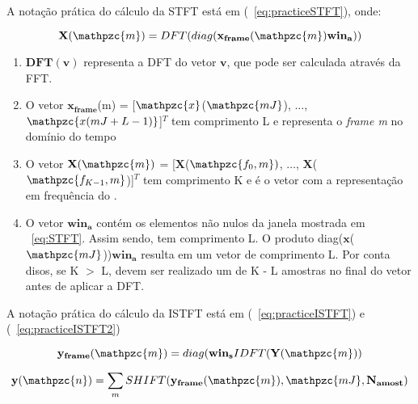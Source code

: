         A notação prática do cálculo da STFT está em (~\ref{eq:practiceSTFT}), onde:


        \begin{equation}\label{eq:practiceSTFT}
            \mathbf{X}(\mathpzc{m})
            = DFT(diag(\mathbf{x_{frame}}(\mathpzc{m})\mathbf{win_a}))
         \end{equation}
    
        \begin{enumerate}
        
            \item $\mathbf{DFT(v)}$ representa a DFT do vetor $\mathbf{v}$, que pode ser calculada através da FFT.
            
            \item O vetor $\mathbf{x_{frame}}$(m) = [$\mathpzc{x}$($\mathpzc{mJ}$), $\dots$, $\mathpzc{x(mJ + L - 1)}$]$^T$ tem comprimento L e representa o \textit{frame m} no domínio do tempo
            
            \item O vetor $\mathbf{X}(\mathpzc{m})$ = [$\mathbf{X}$($\mathpzc{f_0,m})$, $\dots$, $\mathbf{X}$($\mathpzc{f_{K-1},m}$)]$^T$ tem comprimento K e é o vetor com a representação em
            frequência do .
            
            \item O vetor $\mathbf{win_a}$ contém os elementos não nulos da janela mostrada em ~\ref{eq:STFT}. Assim sendo, tem comprimento L. O produto diag($\mathbf{x}$($\mathpzc{mJ}$))$\mathbf{win_a}$ resulta em um vetor de comprimento L. Por conta disos, se K $>$ L, devem ser realizado um  de K - L amostras no final do vetor antes de aplicar a DFT.
        
        \end{enumerate}
        A notação prática do cálculo da ISTFT está em (~\ref{eq:practiceISTFT}) e (~\ref{eq:practiceISTFT2})
        
        \begin{equation}\label{eq:practiceISTFT}
            \mathbf{y_{frame}}(\mathpzc{m})
            = diag(\mathbf{win_s}IDFT(\mathbf{Y}(\mathpzc{m}))
         \end{equation}
        
        \begin{equation}\label{eq:practiceISTFT2}
            \mathbf{y}(\mathpzc{n})
            = \sum_{m}SHIFT(\mathbf{y_{frame}}(\mathpzc{m}),\mathpzc{mJ},\mathbf{N_{amost}})
         \end{equation}
        
